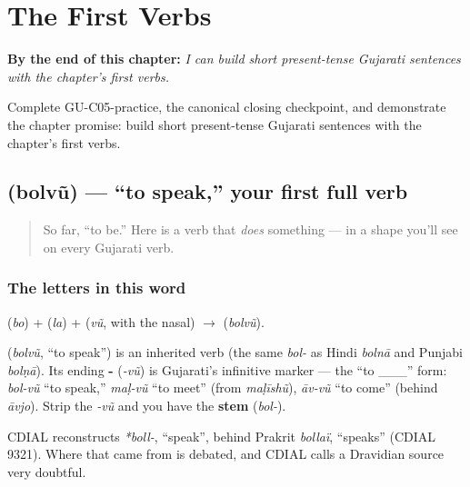 
\chapter{The First Verbs}
\label{ch:first-verbs}

\begin{chapteropening}
\textbf{By the end of this chapter:} \emph{I can build short present-tense Gujarati sentences with the chapter's first verbs.}

Complete GU-C05-practice, the canonical closing checkpoint, and demonstrate the chapter promise: build short present-tense Gujarati sentences with the chapter's first verbs.
\end{chapteropening}

\section[\texorpdfstring{\gu{બોલવું} (bolvũ)}{બોલવું (bolvũ)}]{ (bolvũ) — \textquotedblleft{}to speak,\textquotedblright{} your first full verb}

\label{lesson:GU-C05-bolvun}



\begin{quote}
So far, \textquotedblleft{}to be.\textquotedblright{} Here is a verb that \emph{does} something — in a shape you'll see on every Gujarati verb.
\end{quote}

\subsection*{The letters in this word}
\textbf{} (\emph{bo}) + \textbf{} (\emph{la}) + \textbf{} (\emph{vũ}, with the nasal) $\to$ \textbf{} (\emph{bolvũ}).

\begin{cousinweb}
\textbf{} (\emph{bolvũ}, \textquotedblleft{}to speak\textquotedblright{}) is an inherited verb (the same \emph{bol-} as Hindi \emph{bolnā} and Punjabi \emph{bolṇā}). Its ending \textbf{-} (\emph{-vũ}) is Gujarati's infinitive marker — the \textquotedblleft{}to \_\_\_\textquotedblright{} form: \emph{bol-vũ} \textquotedblleft{}to speak,\textquotedblright{} \emph{maḷ-vũ} \textquotedblleft{}to meet\textquotedblright{} (from \emph{maḷīshũ}), \emph{āv-vũ} \textquotedblleft{}to come\textquotedblright{} (behind \emph{āvjo}). Strip the \emph{-vũ} and you have the \textbf{stem} (\emph{bol-}).

CDIAL reconstructs \emph{*boll-}, \textquotedblleft{}speak\textquotedblright{}, behind Prakrit \emph{bollaï}, \textquotedblleft{}speaks\textquotedblright{} (CDIAL 9321). Where that came from is debated, and CDIAL calls a Dravidian source very doubtful.
\end{cousinweb}

